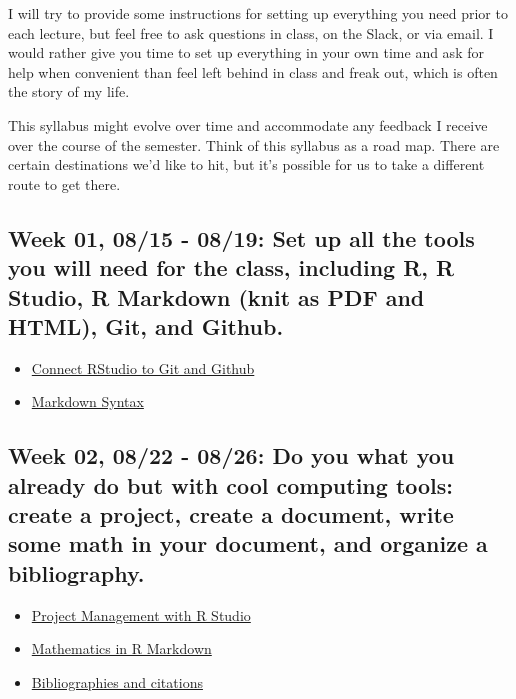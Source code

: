 \documentclass[11pt,]{article}
\providecommand{\tightlist}{%
  \setlength{\itemsep}{0pt}\setlength{\parskip}{0pt}}
\begin{document}
I will try to provide some instructions for setting up everything you
need prior to each lecture, but feel free to ask questions in class, on
the Slack, or via email. I would rather give you time to set up
everything in your own time and ask for help when convenient than feel
left behind in class and freak out, which is often the story of my life.

This syllabus might evolve over time and accommodate any feedback I
receive over the course of the semester. Think of this syllabus as a
road map. There are certain destinations we'd like to hit, but it's
possible for us to take a different route to get there.

\hypertarget{week-01-0815---0819-set-up-all-the-tools-you-will-need-for-the-class-including-r-r-studio-r-markdown-knit-as-pdf-and-html-git-and-github.}{%
\subsection{Week 01, 08/15 - 08/19: Set up all the tools you will need
for the class, including R, R Studio, R Markdown (knit as PDF and HTML),
Git, and
Github.}\label{week-01-0815---0819-set-up-all-the-tools-you-will-need-for-the-class-including-r-r-studio-r-markdown-knit-as-pdf-and-html-git-and-github.}}

\begin{itemize}
\tightlist
\item
  \href{https://happygitwithr.com/rstudio-git-github.html}{Connect
  RStudio to Git and Github}
\item
  \href{https://bookdown.org/yihui/rmarkdown/markdown-syntax.html}{Markdown
  Syntax}
\end{itemize}

\hypertarget{week-02-0822---0826-do-you-what-you-already-do-but-with-cool-computing-tools-create-a-project-create-a-document-write-some-math-in-your-document-and-organize-a-bibliography.}{%
\subsection{Week 02, 08/22 - 08/26: Do you what you already do but with
cool computing tools: create a project, create a document, write some
math in your document, and organize a
bibliography.}\label{week-02-0822---0826-do-you-what-you-already-do-but-with-cool-computing-tools-create-a-project-create-a-document-write-some-math-in-your-document-and-organize-a-bibliography.}}

\begin{itemize}
\tightlist
\item
  \href{https://swcarpentry.github.io/r-novice-gapminder/02-project-intro/}{Project
  Management with R Studio}
\item
  \href{https://rpruim.github.io/s341/S19/from-class/MathinRmd.html\#:~:text=Math\%20inside\%20RMarkdown,10n\%3D1n2.}{Mathematics
  in R Markdown}
\item
  \href{https://bookdown.org/yihui/rmarkdown-cookbook/bibliography.html}{Bibliographies
  and citations}
\end{itemize}
\end{document}
